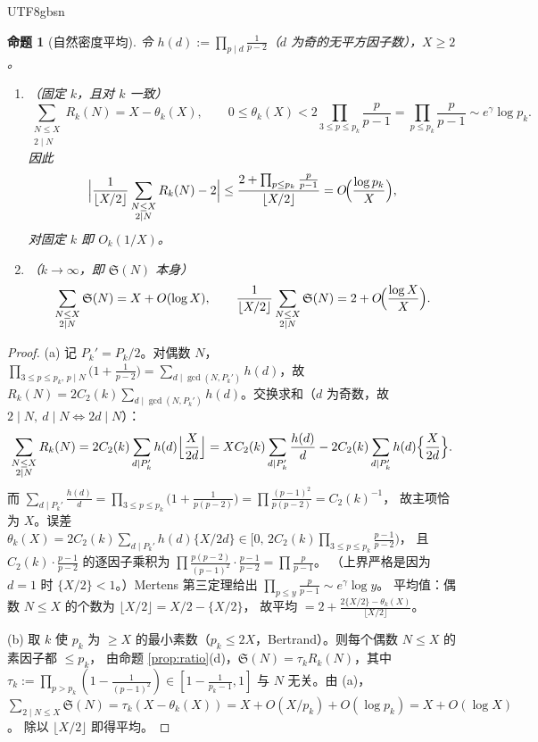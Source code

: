 \documentclass[11pt,a4paper]{article}
\newcommand{\Sing}{\mathfrak S}
\newcommand{\status}[1]{\par\noindent\fbox{\textbf{状态：#1}}\par\smallskip}
\theoremstyle{plain}
\newtheorem{prop}{命题}[section]
\theoremstyle{definition}
\begin{document}
\begin{CJK}{UTF8}{gbsn}
\begin{prop}[自然密度平均]\label{prop:density}
令 $h(d):=\prod_{p\mid d}\frac1{p-2}$（$d$ 为奇的无平方因子数），$X\ge2$。
\begin{enumerate}[label=(\alph*)]
\item（固定 $k$，且对 $k$ 一致）
\[
\sum_{\substack{N\le X\\ 2\mid N}}R_k(N)=X-\theta_k(X),\qquad
0\le\theta_k(X)<2\prod_{3\le p\le p_k}\frac{p}{p-1}=\prod_{p\le p_k}\frac p{p-1}\sim e^{\gamma}\log p_k .
\]
因此
\[
\Bigl|\frac1{\lfloor X/2\rfloor}\sum_{\substack{N\le X\\2\mid N}}R_k(N)-2\Bigr|
\le\frac{2+\prod_{p\le p_k}\frac p{p-1}}{\lfloor X/2\rfloor}=O\!\Bigl(\frac{\log p_k}{X}\Bigr),
\]
对固定 $k$ 即 $O_k(1/X)$。
\item（$k\to\infty$，即 $\Sing(N)$ 本身）
\[
\sum_{\substack{N\le X\\2\mid N}}\Sing(N)=X+O(\log X),\qquad
\frac1{\lfloor X/2\rfloor}\sum_{\substack{N\le X\\2\mid N}}\Sing(N)=2+O\!\Bigl(\frac{\log X}{X}\Bigr).
\]
\end{enumerate}
\end{prop}
\status{已证}
\begin{proof}
(a) 记 $P_k'=P_k/2$。对偶数 $N$，
$\prod_{3\le p\le p_k,\,p\mid N}\bigl(1+\frac1{p-2}\bigr)=\sum_{d\mid\gcd(N,P_k')}h(d)$，故
$R_k(N)=2C_2(k)\sum_{d\mid\gcd(N,P_k')}h(d)$。交换求和（$d$ 为奇数，故 $2\mid N,\ d\mid N\iff 2d\mid N$）：
\[
\sum_{\substack{N\le X\\2\mid N}}R_k(N)=2C_2(k)\sum_{d\mid P_k'}h(d)\Bigl\lfloor\frac X{2d}\Bigr\rfloor
=XC_2(k)\sum_{d\mid P_k'}\frac{h(d)}d-2C_2(k)\sum_{d\mid P_k'}h(d)\Bigl\{\frac X{2d}\Bigr\}.
\]
而 $\sum_{d\mid P_k'}\frac{h(d)}d=\prod_{3\le p\le p_k}\bigl(1+\frac1{p(p-2)}\bigr)=\prod\frac{(p-1)^2}{p(p-2)}=C_2(k)^{-1}$，
故主项恰为 $X$。误差
$\theta_k(X)=2C_2(k)\sum_{d\mid P_k'}h(d)\{X/2d\}\in\bigl[0,\,2C_2(k)\prod_{3\le p\le p_k}\frac{p-1}{p-2}\bigr)$，
且 $C_2(k)\cdot\frac{p-1}{p-2}$ 的逐因子乘积为 $\prod\frac{p(p-2)}{(p-1)^2}\cdot\frac{p-1}{p-2}=\prod\frac p{p-1}$。
（上界严格是因为 $d=1$ 时 $\{X/2\}<1$。）Mertens 第三定理给出 $\prod_{p\le y}\frac p{p-1}\sim e^\gamma\log y$。
平均值：偶数 $N\le X$ 的个数为 $\lfloor X/2\rfloor=X/2-\{X/2\}$，
故平均 $=2+\frac{2\{X/2\}-\theta_k(X)}{\lfloor X/2\rfloor}$。

(b) 取 $k$ 使 $p_k$ 为 $\ge X$ 的最小素数（$p_k\le2X$，Bertrand）。则每个偶数 $N\le X$ 的素因子都 $\le p_k$，
由命题 \ref{prop:ratio}(d)，$\Sing(N)=\tau_k R_k(N)$，其中 $\tau_k:=\prod_{p>p_k}(1-\frac1{(p-1)^2})\in[1-\frac1{p_k-1},1]$
与 $N$ 无关。由 (a)，
$\sum_{2\mid N\le X}\Sing(N)=\tau_k(X-\theta_k(X))=X+O(X/p_k)+O(\log p_k)=X+O(\log X)$。
除以 $\lfloor X/2\rfloor$ 即得平均。
\end{proof}


\end{CJK}
\end{document}
